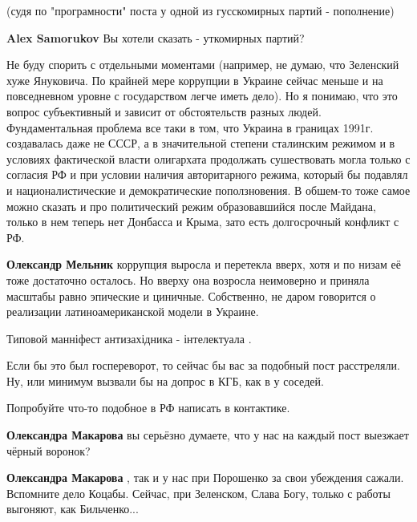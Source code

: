 \begin{itemize}
\begin{itemize}
\end{itemize} %

(судя по "програмности" поста у одной из гусскомирных партий - пополнение)


\textbf{Alex Samorukov} Вы хотели сказать - уткомирных партий?



Не буду спорить с отдельными моментами (например, не думаю, что Зеленский хуже
Януковича. По крайней мере коррупции в Украине сейчас меньше и на повседневном
уровне с государством легче иметь дело). Но я понимаю, что это вопрос
субъективный и зависит от обстоятельств разных людей. Фундаментальная проблема
все таки в том, что Украина в границах 1991г. создавалась даже не СССР, а в
значительной степени сталинским режимом и в условиях фактической власти
олигархата продолжать сушествовать могла только с согласия РФ и при условии
наличия авторитарного режима, который бы подавлял и националистические и
демократические поползновения. В обшем-то тоже самое можно сказать и про
политический режим образовавшийся после Майдана, только в нем теперь нет
Донбасса и Крыма, зато есть долгосрочный конфликт с РФ.

\begin{itemize} %
\textbf{Олександр Мельник} коррупция выросла и перетекла вверх, хотя и по низам её тоже достаточно осталось. Но вверху она возросла неимоверно и приняла масштабы равно эпические и циничные. Собственно, не даром говорится о реализации латиноамериканской модели в Украине.
\end{itemize} %

Типовой манніфест антизахідника - інтелектуала .


Если бы это был госпереворот, то сейчас бы вас за подобный пост расстреляли.
Ну, или минимум вызвали бы на допрос в КГБ, как в у соседей.

Попробуйте что-то подобное в РФ написать в контактике.

\begin{itemize} %
\textbf{Олександра Макарова} вы серьёзно думаете, что у нас на каждый пост выезжает чёрный воронок?

\textbf{Олександра Макарова} , так и у нас при Порошенко за свои убеждения сажали. Вспомните дело Коцабы. Сейчас, при Зеленском, Слава Богу, только с работы выгоняют, как Бильченко...


\end{itemize}
\end{itemize}
